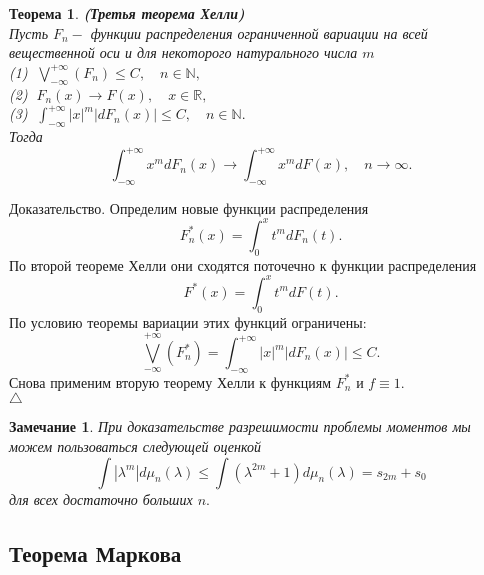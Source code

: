 \documentclass[12 pt, a4 paper]{article}
\theoremstyle{plain}   \newtheorem{Pro}{Задача}
\newtheorem{Rem}{Замечание}
\newtheorem{The}{Теорема}
\begin{document}
\begin{The}
{\bfseries (Третья теорема Хелли)}\\
Пусть
$ F_n - $
функции распределения ограниченной вариации на всей вещественной
оси и для некоторого натурального числа
$ m $ \\
(1) $ \; \bigvee _{-\infty}^{+\infty}(F_n ) \leq C,
\quad n \in \mathbb{N}, $\\
(2) $ \; F_n (x) \rightarrow F(x), \quad x \in \mathbb{R}, $ \\
(3) $ \; \int _{-\infty}^{+\infty}|x|^m |dF_n (x)| \leq C,
\quad n \in \mathbb{N}. $\\
Тогда
$$
  \int _{-\infty}^{+\infty} x^m dF_n (x) \rightarrow
  \int _{-\infty}^{+\infty} x^m dF(x), \quad n \rightarrow \infty .
$$
\end{The}
{\Large Доказательство.}
Определим новые функции распределения
$$
  F_n ^{\ast}(x)=\int _0 ^x t^m dF_n (t).
$$
По второй теореме Хелли они сходятся поточечно к функции распределения
$$
  F^{\ast}(x)=\int _0 ^x t^m dF(t).
$$
По условию теоремы вариации этих функций ограничены:
$$
  \bigvee _{-\infty}^{+\infty}(F_n ^{\ast})=
  \int _{-\infty}^{+\infty} |x|^m |dF_n (x)| \leq C.
$$
Снова применим вторую теорему Хелли к функциям
$ F_n ^{\ast} $
и
$ f \equiv 1 . $\\
$ \triangle $
\begin{Rem}
При доказательстве разрешимости проблемы моментов мы можем
пользоваться следующей оценкой
$$
  \int |\lambda ^m | d \mu _n (\lambda ) \leq
  \int (\lambda ^{2m}+1)d \mu _n (\lambda ) =
  s_{2m}+s_0
$$
для всех достаточно больших
$ n . $
\end{Rem}
\newpage
\subsection{Теорема Маркова}
$ \; $
\\
\end{document}
